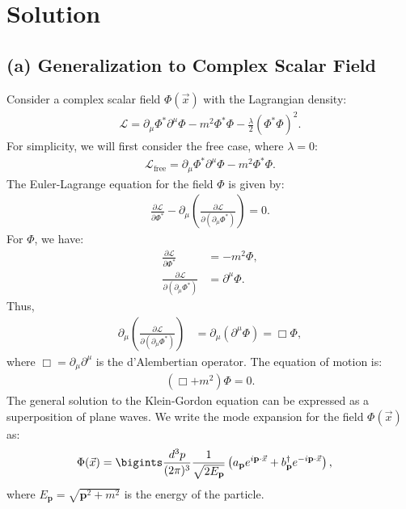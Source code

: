{\section*{Solution}
\subsection*{(a) Generalization to Complex Scalar Field}
Consider a complex scalar field \(\Phi(\vec{x})\) with the Lagrangian density:
\begin{align}
    \mathcal{L} = \partial_\mu \Phi^* \partial^\mu \Phi - m^2 \Phi^* \Phi - \frac{\lambda}{2} (\Phi^* \Phi)^2.
\end{align}
For simplicity, we will first consider the free case, where \(\lambda = 0\):
\begin{align}
    \mathcal{L}_{\text{free}} = \partial_\mu \Phi^* \partial^\mu \Phi - m^2 \Phi^* \Phi.
\end{align}
The Euler-Lagrange equation for the field \(\Phi\) is given by:
\begin{align}
    \frac{\partial \mathcal{L}}{\partial \Phi^*} - \partial_\mu \left( \frac{\partial \mathcal{L}}{\partial (\partial_\mu \Phi^*)} \right) = 0.
\end{align}
For \(\Phi\), we have:
\begin{align}
    \frac{\partial \mathcal{L}}{\partial \Phi^*} &= -m^2 \Phi, \\
    \frac{\partial \mathcal{L}}{\partial (\partial_\mu \Phi^*)} &= \partial^\mu \Phi.
\end{align}
Thus,
\begin{align}
    \partial_\mu \left( \frac{\partial \mathcal{L}}{\partial (\partial_\mu \Phi^*)} \right) &= \partial_\mu \left( \partial^\mu \Phi \right) = \Box \Phi,
\end{align}
where \(\Box = \partial_\mu \partial^\mu\) is the d'Alembertian operator. The equation of motion is:
\begin{align}
    (\Box + m^2) \Phi = 0.
\end{align}
The general solution to the Klein-Gordon equation can be expressed as a superposition of plane waves. We write the mode expansion for the field \(\Phi(\vec{x})\) as:
\begin{align}
    \Phi(\vec{x}) &= \bigints\frac{d^3p}{(2\pi)^3} \frac{1}{\sqrt{2E_{\mathbf{p}}}} \left( a_{\mathbf{p}} e^{i \mathbf{p} \cdot \vec{x}} + b^\dagger_{\mathbf{p}} e^{-i \mathbf{p} \cdot \vec{x}} \right),
\end{align}
where \(E_{\mathbf{p}} = \sqrt{\mathbf{p}^2 + m^2}\) is the energy of the particle.

}
